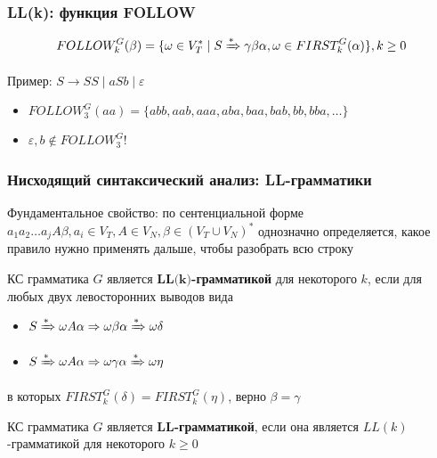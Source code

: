 \documentclass{beamer}
\newcommand{\derive}[0]{\xRightarrow[]{*}}
\begin{document}
\begin{frame}[fragile]
  \transwipe[direction=90]
  \frametitle{LL(k): функция FOLLOW}
  \[FOLLOW^G_k(\beta) = \{ \omega \in V_T^* \mid S \derive \gamma \beta \alpha, \omega \in FIRST^G_k(\alpha) \}, k \geq 0\]

  \vfill
  
   Пример: $S \to S S \mid a S b \mid \varepsilon$
   
   \begin{itemize}
     \item  $FOLLOW^G_3( a a ) = \{ a b b, a a b, a a a, a b a, b a a, b a b, b b, b b a, \dots \}$
     \item $\varepsilon, b \notin FOLLOW^G_3$!
   \end{itemize}
\end{frame}


\begin{frame}[fragile]
  \transwipe[direction=90]
  \frametitle{Нисходящий синтаксический анализ: LL-грамматики}
    Фундаментальное свойство: по сентенциальной форме $a_1 a_2 \dots a_j A \beta, a_i \in V_T, A \in V_N, \beta \in (V_T \cup V_N)^*$ однозначно определяется, какое правило нужно применять дальше, чтобы разобрать всю строку \pause
    
    \vfill
      
   КС грамматика $G$ является $\textbf{LL(k)}$\textbf{-грамматикой} для некоторого $k$,  если для любых двух левосторонних выводов вида 
  \begin{itemize}
    \item $S \derive \omega A \alpha \Rightarrow \omega \beta \alpha \derive \omega \delta$
    \item $S \derive \omega A \alpha \Rightarrow \omega \gamma \alpha \derive \omega \eta$
  \end{itemize}
  в которых $FIRST^G_k(\delta) = FIRST ^G_k(\eta)$, верно $\beta = \gamma$

\vfill

  КС грамматика $G$ является $\textbf{LL}$\textbf{-грамматикой}, если она является $LL(k)$-грамматикой для некоторого $k \geq 0$
\end{frame}
\end{document}
